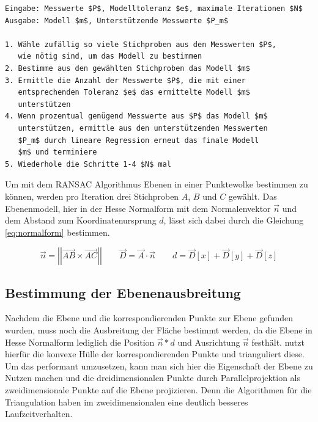 \begin{lstlisting}[mathescape,caption=Der RANSAC Algorithmus, label=lst:ransac]
Eingabe: Messwerte $P$, Modelltoleranz $e$, maximale Iterationen $N$
Ausgabe: Modell $m$, Unterstützende Messwerte $P_m$

1. Wähle zufällig so viele Stichproben aus den Messwerten $P$,
   wie nötig sind, um das Modell zu bestimmen
2. Bestimme aus den gewählten Stichproben das Modell $m$
3. Ermittle die Anzahl der Messwerte $P$, die mit einer 
   entsprechenden Toleranz $e$ das ermittelte Modell $m$ 
   unterstützen
4. Wenn prozentual genügend Messwerte aus $P$ das Modell $m$ 
   unterstützen, ermittle aus den unterstützenden Messwerten 
   $P_m$ durch lineare Regression erneut das finale Modell 
   $m$ und terminiere
5. Wiederhole die Schritte 1-4 $N$ mal
\end{lstlisting} 

Um mit dem RANSAC Algorithmus Ebenen in einer Punktewolke bestimmen zu können, werden pro Iteration drei Stichproben \(A\), \(B\) und \(C\) gewählt. Das Ebenenmodell, hier in der Hesse Normalform mit dem Normalenvektor \(\vec{n}\) und dem Abstand zum Koordinatenursprung \(d\), lässt sich dabei durch die Gleichung \ref{eq:normalform} bestimmen.

\begin{equation}\label{eq:normalform}
\vec{n} =\left|\left| \vec{AB} \times \vec{AC}\right|\right|
\qquad
\vec{D} = \vec{A} \cdot \vec{n}
\qquad
d = \vec{D}\left[x\right] + \vec{D}\left[y\right] + \vec{D}\left[z\right]
\end{equation}

\subsection{Bestimmung der Ebenenausbreitung}

Nachdem die Ebene und die korrespondierenden Punkte zur Ebene gefunden wurden, muss noch die Ausbreitung der Fläche bestimmt werden, da die Ebene in Hesse Normalform lediglich die Position \(\vec{n} * d\) und Ausrichtung \(\vec{n}\) festhält. \citet{PlanarSurfaceMapping} nutzt hierfür die konvexe Hülle der korrespondierenden Punkte und trianguliert diese. Um das performant umzusetzen, kann man sich hier die Eigenschaft der Ebene zu Nutzen machen und die dreidimensionalen Punkte durch Parallelprojektion als zweidimensionale Punkte auf die Ebene projizieren. Denn die Algorithmen für die Triangulation haben im zweidimensionalen eine deutlich besseres Laufzeitverhalten. \\

